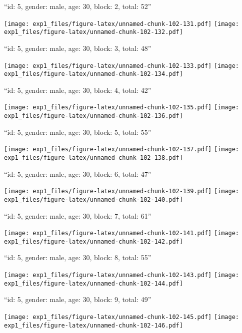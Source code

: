 \documentclass[11pt,,]{article}
\begin{document}
\newpage
[1] 

``id: 5, gender: male, age: 30, block: 2, total: 52''

\texttt{[image: exp1\_files/figure-latex/unnamed-chunk-102-131.pdf]}
\texttt{[image: exp1\_files/figure-latex/unnamed-chunk-102-132.pdf]}

\newpage
[1] 

``id: 5, gender: male, age: 30, block: 3, total: 48''

\texttt{[image: exp1\_files/figure-latex/unnamed-chunk-102-133.pdf]}
\texttt{[image: exp1\_files/figure-latex/unnamed-chunk-102-134.pdf]}

\newpage
[1] 

``id: 5, gender: male, age: 30, block: 4, total: 42''

\texttt{[image: exp1\_files/figure-latex/unnamed-chunk-102-135.pdf]}
\texttt{[image: exp1\_files/figure-latex/unnamed-chunk-102-136.pdf]}

\newpage
[1] 

``id: 5, gender: male, age: 30, block: 5, total: 55''

\texttt{[image: exp1\_files/figure-latex/unnamed-chunk-102-137.pdf]}
\texttt{[image: exp1\_files/figure-latex/unnamed-chunk-102-138.pdf]}

\newpage
[1] 

``id: 5, gender: male, age: 30, block: 6, total: 47''

\texttt{[image: exp1\_files/figure-latex/unnamed-chunk-102-139.pdf]}
\texttt{[image: exp1\_files/figure-latex/unnamed-chunk-102-140.pdf]}

\newpage
[1] 

``id: 5, gender: male, age: 30, block: 7, total: 61''

\texttt{[image: exp1\_files/figure-latex/unnamed-chunk-102-141.pdf]}
\texttt{[image: exp1\_files/figure-latex/unnamed-chunk-102-142.pdf]}

\newpage
[1] 

``id: 5, gender: male, age: 30, block: 8, total: 55''

\texttt{[image: exp1\_files/figure-latex/unnamed-chunk-102-143.pdf]}
\texttt{[image: exp1\_files/figure-latex/unnamed-chunk-102-144.pdf]}

\newpage
[1] 

``id: 5, gender: male, age: 30, block: 9, total: 49''

\texttt{[image: exp1\_files/figure-latex/unnamed-chunk-102-145.pdf]}
\texttt{[image: exp1\_files/figure-latex/unnamed-chunk-102-146.pdf]}
\end{document}
